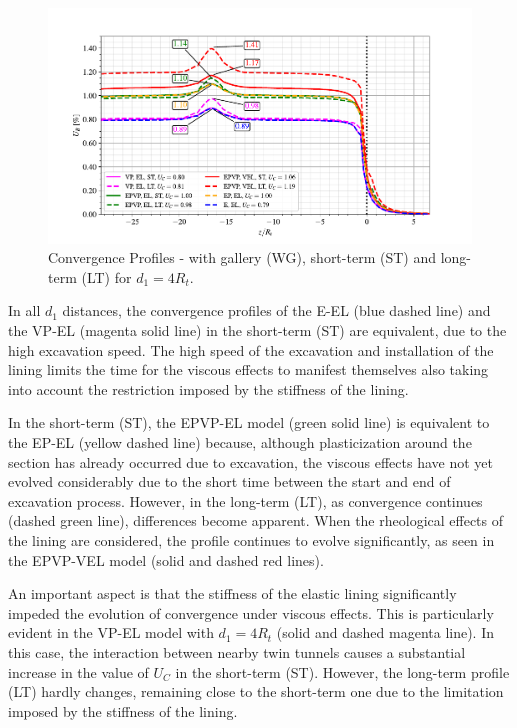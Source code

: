 \documentclass[a4paper,fleqn]{cas-sc}
\begin{document}
\begin{figure}[h!]
	\centering
	\includegraphics[scale=0.9]{Convergence Profiles - WG_ST_LT - $d_1=4R_i$_anotate.pdf}
	\caption{Convergence Profiles - with gallery (WG), short-term (ST) and long-term (LT) for $d_1 = 4R_t$.}
	\label{WG-ST-LT-D1-4RI}
\end{figure}
\FloatBarrier
In all $d_1$ distances, the convergence profiles of the E-EL (blue dashed line) and the VP-EL (magenta solid line) in the short-term (ST) are equivalent, due to the high excavation speed. The high speed of the excavation and installation of the lining limits the time for the viscous effects to manifest themselves also taking into account the restriction imposed by the stiffness of the lining.

In the short-term (ST), the EPVP-EL model (green solid line) is equivalent to the EP-EL (yellow dashed line) because, although plasticization around the section has already occurred due to excavation, the viscous effects have not yet evolved considerably due to the short time between the start and end of excavation process. However, in the long-term (LT), as convergence continues (dashed green line), differences become apparent. When the rheological effects of the lining are considered, the profile continues to evolve significantly, as seen in the EPVP-VEL model (solid and dashed red lines).

An important aspect is that the stiffness of the elastic lining significantly impeded the evolution of convergence under viscous effects. This is particularly evident in the VP-EL model with $d_1=4R_t$ (solid and dashed magenta line). In this case, the interaction between nearby twin tunnels causes a substantial increase in the value of $U_{C}$ in the short-term (ST). However, the long-term profile (LT) hardly changes, remaining close to the short-term one due to the limitation imposed by the stiffness of the lining.
\end{document}
